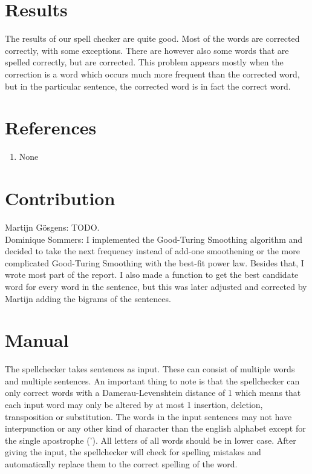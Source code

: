 \documentclass[a4paper,twoside,11pt]{article}
\begin{document}
\section{Results}
The results of our spell checker are quite good. Most of the words are corrected correctly, with some exceptions. There are however also some words that are spelled correctly, but are corrected. This problem appears mostly when the correction is a word which occurs much more frequent than the corrected word, but in the particular sentence, the corrected word is in fact the correct word.

\section{References}
\begin{enumerate}
\item None
\end{enumerate}

\section{Contribution}
Martijn Gösgens: TODO. \\
Dominique Sommers: I implemented the Good-Turing Smoothing algorithm and decided to take the next frequency instead of add-one smoothening or the more complicated Good-Turing Smoothing with the best-fit power law. Besides that, I wrote most part of the report. I also made a function to get the best candidate word for every word in the sentence, but this was later adjusted and corrected by Martijn adding the bigrams of the sentences.

\section{Manual}
The spellchecker takes sentences as input. These can consist of multiple words and multiple sentences. An important thing to note is that the spellchecker can only correct words with a Damerau-Levenshtein distance of 1 which means that each input word may only be altered by at most 1 insertion, deletion, transposition or substitution. The words in the input sentences may not have interpunction or any other kind of character than the english alphabet except for the single apostrophe ('). All letters of all words should be in lower case. After giving the input, the spellchecker will check for spelling mistakes and automatically replace them to the correct spelling of the word.
\end{document}
